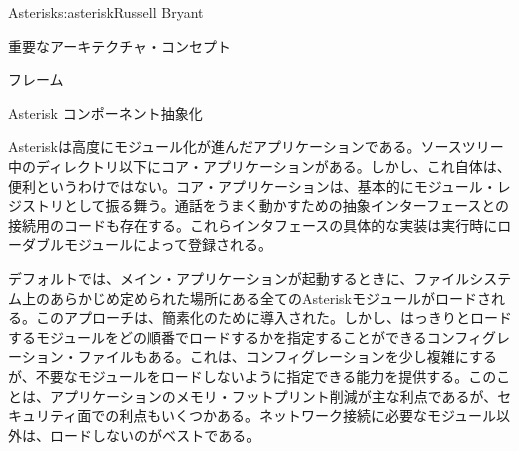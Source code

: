 \begin{aosachapter}{Asterisk}{s:asterisk}{Russell Bryant}
\begin{aosasect1}{重要なアーキテクチャ・コンセプト}
\begin{aosasect2}{フレーム}
\end{aosasect2}

\end{aosasect1}

\begin{aosasect1}{Asterisk コンポーネント抽象化}

Asteriskは高度にモジュール化が進んだアプリケーションである。ソースツリー中のディレクトリ以下にコア・アプリケーションがある。しかし、これ自体は、便利というわけではない。コア・アプリケーションは、基本的にモジュール・レジストリとして振る舞う。通話をうまく動かすための抽象インターフェースとの接続用のコードも存在する。これらインタフェースの具体的な実装は実行時にローダブルモジュールによって登録される。

デフォルトでは、メイン・アプリケーションが起動するときに、ファイルシステム上のあらかじめ定められた場所にある全てのAsteriskモジュールがロードされる。このアプローチは、簡素化のために導入された。しかし、はっきりとロードするモジュールをどの順番でロードするかを指定することができるコンフィグレーション・ファイルもある。これは、コンフィグレーションを少し複雑にするが、不要なモジュールをロードしないように指定できる能力を提供する。このことは、アプリケーションのメモリ・フットプリント削減が主な利点であるが、セキュリティ面での利点もいくつかある。ネットワーク接続に必要なモジュール以外は、ロードしないのがベストである。


\end{aosasect1}
\end{aosachapter}
